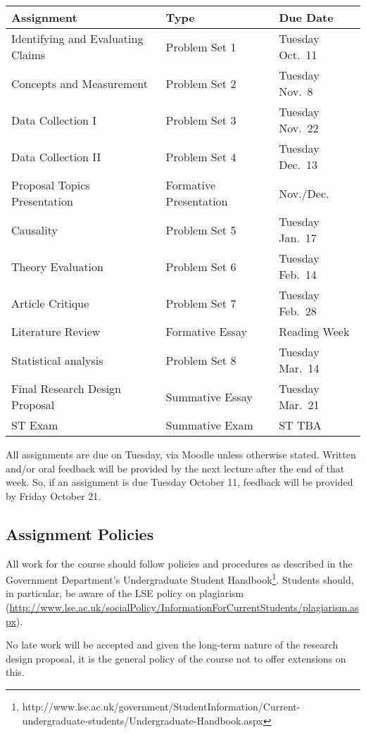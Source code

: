 \documentclass[12pt,a4paper]{article}
\begin{document}
\begin{center}
\begin{tabular}{lll} \toprule
\textbf{Assignment} & \textbf{Type} & \textbf{Due Date} \\ \midrule
Identifying and Evaluating Claims & Problem Set 1 & Tuesday Oct.~11 \\
Concepts and Measurement & Problem Set 2 & Tuesday Nov.~8 \\
Data Collection I & Problem Set 3 & Tuesday Nov.~22 \\
Data Collection II & Problem Set 4 & Tuesday Dec.~13 \\
Proposal Topics Presentation & Formative Presentation & Nov./Dec. \\  \midrule 
Causality & Problem Set 5 & Tuesday Jan.~17 \\
Theory Evaluation & Problem Set 6 & Tuesday Feb.~14 \\
Article Critique & Problem Set 7 & Tuesday Feb.~28 \\
Literature Review & Formative Essay & Reading Week \\ 
Statistical analysis & Problem Set 8 & Tuesday Mar.~14 \\ \midrule 
Final Research Design Proposal & Summative Essay & Tuesday Mar.~21 \\ \midrule 
ST Exam & Summative Exam & ST TBA \\
\bottomrule
\end{tabular}
\end{center}

All assignments are due on Tuesday, via Moodle unless otherwise stated. Written and/or oral feedback will be provided by the next lecture after the end of that week. So, if an assignment is due Tuesday October 11, feedback will be provided by Friday October 21.

\subsection{Assignment Policies}

All work for the course should follow policies and procedures as described in the Government Department's Undergraduate Student Handbook\footnote{http://www.lse.ac.uk/government/StudentInformation/Current-undergraduate-students/Undergraduate-Handbook.aspx}. Students should, in particular, be aware of the LSE policy on plagiarism (\url{http://www.lse.ac.uk/socialPolicy/InformationForCurrentStudents/plagiarism.aspx}).

No late work will be accepted and given the long-term nature of the research design proposal, it is the general policy of the course not to offer extensions on this.
\end{document}
